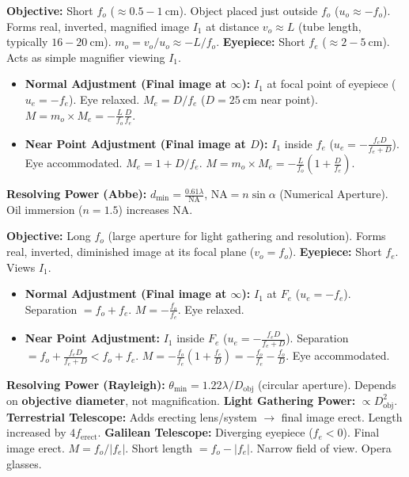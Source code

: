 \documentclass[11pt]{article}
\begin{document}
\begin{propriete}
\textbf{Objective:} Short $f_o$ ($\approx 0.5-1\ \mathrm{cm}$). Object placed just outside $f_o$ ($u_o \approx -f_o$). Forms real, inverted, magnified image $I_1$ at distance $v_o \approx L$ (tube length, typically $16-20\ \mathrm{cm}$).
$m_o = v_o/u_o \approx -L/f_o$.
\textbf{Eyepiece:} Short $f_e$ ($\approx 2-5\ \mathrm{cm}$). Acts as simple magnifier viewing $I_1$.
\begin{itemize}
\item \textbf{Normal Adjustment (Final image at $\infty$):} $I_1$ at focal point of eyepiece ($u_e = -f_e$). Eye relaxed. $M_e = D/f_e$ ($D=25\ \mathrm{cm}$ near point). $M = m_o \times M_e = -\frac{L}{f_o} \frac{D}{f_e}$.
\item \textbf{Near Point Adjustment (Final image at $D$):} $I_1$ inside $f_e$ ($u_e = -\frac{f_e D}{f_e+D}$). Eye accommodated. $M_e = 1 + D/f_e$. $M = m_o \times M_e = -\frac{L}{f_o}(1 + \frac{D}{f_e})$.
\end{itemize}
\textbf{Resolving Power (Abbe):} $d_{\min} = \frac{0.61\lambda}{\text{NA}}$, $\text{NA} = n\sin\alpha$ (Numerical Aperture). Oil immersion ($n=1.5$) increases NA.
\end{propriete}

\begin{propriete}
\textbf{Objective:} Long $f_o$ (large aperture for light gathering and resolution). Forms real, inverted, diminished image at its focal plane ($v_o = f_o$).
\textbf{Eyepiece:} Short $f_e$. Views $I_1$.
\begin{itemize}
\item \textbf{Normal Adjustment (Final image at $\infty$):} $I_1$ at $F_e$ ($u_e = -f_e$). Separation $= f_o + f_e$. $M = -\frac{f_o}{f_e}$. Eye relaxed.
\item \textbf{Near Point Adjustment:} $I_1$ inside $F_e$ ($u_e = -\frac{f_e D}{f_e+D}$). Separation $= f_o + \frac{f_e D}{f_e+D} < f_o+f_e$. $M = -\frac{f_o}{f_e}(1 + \frac{f_e}{D}) = -\frac{f_o}{f_e} - \frac{f_o}{D}$. Eye accommodated.
\end{itemize}
\textbf{Resolving Power (Rayleigh):} $\theta_{\min} = 1.22 \lambda / D_{\text{obj}}$ (circular aperture). Depends on \textbf{objective diameter}, not magnification.
\textbf{Light Gathering Power:} $\propto D_{\text{obj}}^2$.
\textbf{Terrestrial Telescope:} Adds erecting lens/system $\rightarrow$ final image erect. Length increased by $4f_{\text{erect}}$.
\textbf{Galilean Telescope:} Diverging eyepiece ($f_e < 0$). Final image erect. $M = f_o/|f_e|$. Short length $= f_o - |f_e|$. Narrow field of view. Opera glasses.
\end{propriete}
\end{document}
